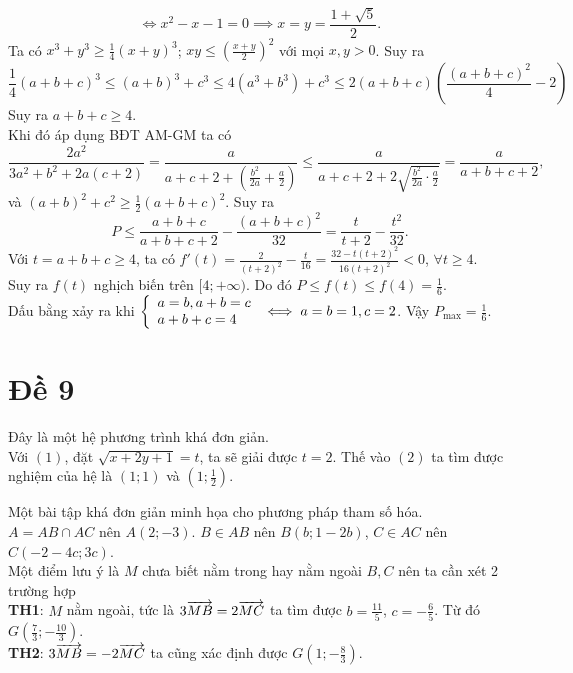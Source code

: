 $$ \iff  x^2-x-1=0\implies  x=y=\dfrac{1+\sqrt{5}}2. $$
\hda 
Ta có $x^3+y^3\ge \frac 14(x+y)^3$; $xy\le \left(\frac{x+y}2\right)^2$ với mọi $x,y>0$. Suy ra
$$ \frac 14(a+b+c)^3\le (a+b)^3+c^3\le 4(a^3+b^3)+c^3\le 2(a+b+c)\left(\frac{(a+b+c)^2}4-2\right) $$
Suy ra $a+b+c\ge 4$.\\
Khi đó áp dụng BĐT AM-GM ta có
$$ \frac{2a^2}{3a^2+b^2+2a(c+2)}=\frac{a}{a+c+2+\left(\frac{b^2}{2a}+\frac a2\right)}\le \frac{a}{a+c+2+2\sqrt{\frac{b^2}{2a}\cdot\frac a2}}=\frac a{a+b+c+2}, $$
và $(a+b)^2+c^2\ge \frac 12(a+b+c)^2$. Suy ra $$P\le \frac{a+b+c}{a+b+c+2}-\frac{(a+b+c)^2}{32}=\frac{t}{t+2}-\frac{t^2}{32}.$$
Với $t=a+b+c\ge 4$, ta có $f'(t)=\frac{2}{(t+2)^2}-\frac{t}{16}=\frac{32-t(t+2)^2}{16(t+2)^2}<0$, $\forall t\ge 4$.\\
Suy ra $f(t)$ nghịch biến trên $[4;+\infty)$. Do đó $P\le f(t)\le f(4)=\frac 16$.\\
Dấu bằng xảy ra khi $\left\{ \begin{array}{l} a=b,a+b=c\\ a+b+c=4 \end{array}\right.\iff  a=b=1,c=2$. Vậy $P_{\max}=\frac 16$.
\section{Đề 9}

\hda 
Đây là một hệ phương trình khá đơn giản.\\
Với $(1)$, đặt $\sqrt{x+2y+1}=t$, ta sẽ giải được $t=2$. Thế vào $(2)$ ta tìm được nghiệm của hệ là $(1;1)$ và $(1;\frac 12)$.

\hda 
Một bài tập khá đơn giản minh họa cho phương pháp tham số hóa.\\
$A=AB\cap AC$ nên $A(2;-3)$. $B\in AB$ nên $B(b;1-2b)$, $C\in AC$ nên $C(-2-4c;3c)$.\\
 Một điểm lưu ý là $M$ chưa biết nằm trong hay nằm ngoài $B,C$ nên ta cần xét 2 trường hợp\\
\textbf{TH1}: $M$ nằm ngoài, tức là $3\overrightarrow{MB}=2\overrightarrow{MC}$ ta tìm được $b=\frac{11}5$, $c=-\frac 65$. Từ đó $G\left(\frac 73;-\frac{10}3\right)$.\\
\textbf{TH2}: $3\overrightarrow{MB}=-2\overrightarrow{MC}$ ta cũng xác định được $G\left(1;-\frac 83\right)$.

